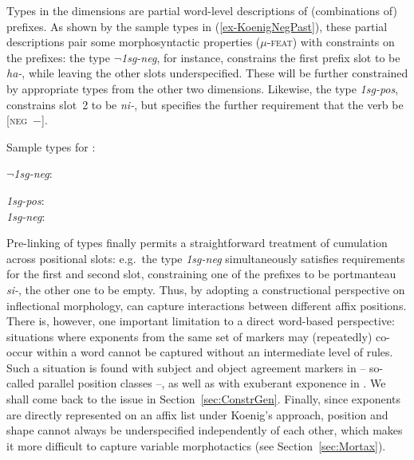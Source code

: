 \documentclass[output=paper
 	        ,biblatex
                ,babelshorthands
                ,newtxmath
                ,draftmode
                ,colorlinks, citecolor=brown
]{langscibook}
\begin{document}
Types in the dimensions are partial word-level descriptions of
(combinations of) prefixes. As shown by the sample types in (\ref{ex-KoenigNegPast}), these partial descriptions pair some
morphosyntactic properties (\textsc{$\mu$-feat}) with constraints on
the prefixes: the type \textit{$\neg$1sg-neg}, for instance, constrains the
first prefix slot to be \textit{ha-}, while leaving the other slots
underspecified. These will be further constrained by appropriate types
from the other two dimensions. Likewise, the type \textit{1sg-pos},
constrains slot~2 to be \textit{ni-}, but specifies the further
requirement that the verb be \textsc{[neg~$-$]}.    

\begin{exe}
\ex\label{ex-KoenigNegPast}
Sample types for :
\begin{xlist}
\ex \textit{$\neg$1sg-neg}:\\

\ex \textit{1sg-pos}:\\
\ex \textit{1sg-neg}:\\
\zl


Pre-linking of types finally permits a straightforward treatment of
cumulation across positional slots: e.g.\ the type \textit{1sg-neg}
simultaneously satisfies requirements for the first and second slot,
constraining one of the prefixes to be portmanteau \textit{si-}, the
other one to be empty. Thus, by adopting a constructional perspective
on inflectional morphology, \citet{Koenig99} can capture interactions
between different affix positions. There is, however, one important
limitation to a direct word-based perspective: situations where
exponents from the same set of markers may (repeatedly) co-occur
within a word cannot be captured without an intermediate level of
rules. Such a situation is found with subject and object agreement
markers in  -- so-called parallel position classes
\citep{Stump93,Crysmann:Bonami:2016} --, as well as with exuberant
exponence in  \citep{Harris09,Crysmann:2018:Batsbi}. We shall
come back to the issue in Section~\ref{sec:ConstrGen}. Finally, since
exponents are directly represented on an affix list under Koenig's
approach, position and shape cannot always be underspecified
independently of each other, which makes it more difficult to
capture variable morphotactics (see Section~\ref{sec:Mortax}).



\end{xlist}
\end{exe}
\end{document}
